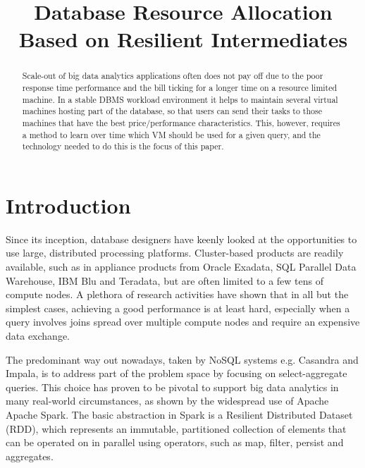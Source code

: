 \documentclass[conference]{IEEEtran}
\begin{document}
\title{Database Resource Allocation Based on Resilient Intermediates}

\author{
}

\maketitle

\begin{abstract} 
Scale-out of big data analytics applications often does not pay off due to the poor response time performance and the bill ticking for a longer time on a resource limited machine.
In a stable DBMS workload environment it helps to maintain several virtual machines hosting part of the database, so that users can send their tasks to those machines that have the best price/performance characteristics.
This, however, requires a method to learn over time which VM should be used for a given query, and the technology needed to do this is the focus of this paper.
\end{abstract} 

\section{Introduction}
\label{Introduction} 
Since its inception, database designers have keenly looked at the opportunities to use large, distributed processing platforms. Cluster-based products are readily available, such as in appliance products from Oracle Exadata, SQL Parallel Data Warehouse, IBM Blu and Teradata, but are often limited to a few tens of compute nodes.
A plethora of research activities have shown that in all but the simplest cases, achieving a good performance is at least  hard, especially when a query involves joins spread over multiple compute nodes and require an expensive data exchange. 

The predominant way out nowadays, taken by NoSQL systems e.g. Casandra and Impala, is to address part of the problem space by focusing on select-aggregate queries.
This choice has proven to be pivotal to support big data analytics in many real-world circumstances, as shown by the widespread use of Apache Apache Spark.
The basic abstraction in Spark is a Resilient Distributed Dataset (RDD), which represents an immutable, partitioned collection of elements that can be operated on in parallel using operators, such as map, filter, persist and aggregates.
\end{document}
